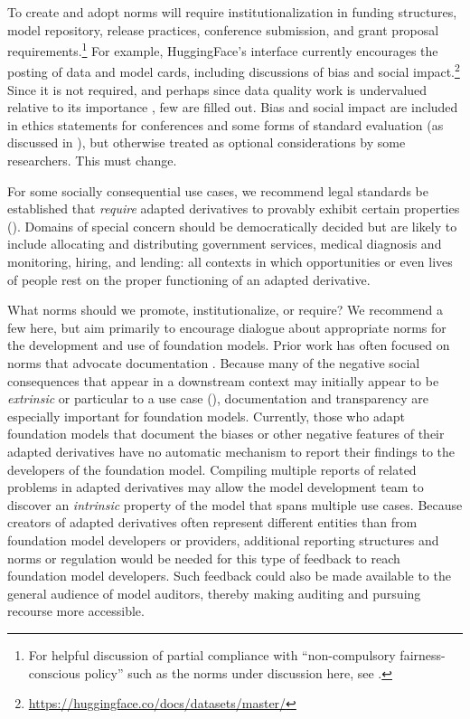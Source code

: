 To create and adopt norms will require institutionalization in funding structures, model repository, release practices, conference submission, and grant proposal requirements.\footnote{For helpful discussion of partial compliance with ``non-compulsory fairness-conscious policy'' such as the norms under discussion here, see \citet{Dai2021}.}  
For example, HuggingFace’s interface currently encourages the posting of data and model cards, including discussions of bias and social impact.\footnote{\url{https://huggingface.co/docs/datasets/master/}} 
Since it is not required, and perhaps since data quality work is undervalued relative to its importance \citep{sambasivan2021everyone}, few are filled out. 
Bias and social impact are included in ethics statements for conferences and some forms of standard evaluation (as discussed in ), but otherwise treated as optional considerations by some researchers. This must change.

For some socially consequential use cases, we recommend legal standards be established that \textit{require} adapted derivatives to provably exhibit certain properties ().
Domains of special concern should be democratically decided but are likely to include allocating and distributing government services, medical diagnosis and monitoring, hiring, and lending: 
all contexts in which opportunities or even lives of people rest on the proper functioning of an adapted derivative. 

What norms should we promote, institutionalize, or require? 
We recommend a few here, but aim primarily to encourage dialogue about appropriate norms for the development and use of foundation models. 
Prior work has often focused on norms that advocate documentation \citep{gebru2018datasheets, bender2018data, Mitchell_2019, dodge2019work}. 
Because many of the negative social consequences that appear in a downstream context may initially appear to be \textit{extrinsic} or particular to a use case (), documentation and transparency are especially important for foundation models. 
Currently, those who adapt foundation models that document the biases or other negative features of their adapted derivatives have no automatic mechanism to report their findings to the developers of the foundation model.  Compiling multiple reports of related problems in adapted derivatives may allow the model development team to discover an \textit{intrinsic} property of the model that spans multiple use cases. 
Because creators of adapted derivatives often represent different entities than from foundation model developers or providers, additional reporting structures and norms or regulation would be needed for this type of feedback to reach foundation model developers. 
Such feedback could also be made available to the general audience of model auditors, thereby making auditing and pursuing recourse more accessible.
 
